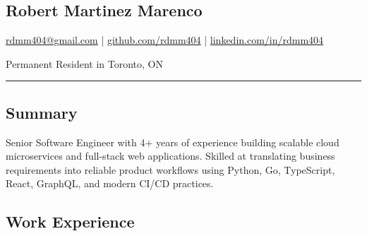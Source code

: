 \documentclass[a4paper,10pt]{article}
\begin{document}
\pagestyle{empty}

\begin{center}
  \section*{\LARGE Robert Martinez Marenco}
  \href{mailto:rdmm404@gmail.com}{rdmm404@gmail.com} |
  \href{https://github.com/rdmm404}{github.com/rdmm404} |
  \href{https://linkedin.com/in/rdmm404}{linkedin.com/in/rdmm404}

  Permanent Resident in Toronto, ON
\end{center}

\hrule
\vspace{4pt}

\subsection*{Summary}
Senior Software Engineer with 4+ years of experience building scalable cloud microservices and full-stack web applications.
Skilled at translating business requirements into reliable product workflows using Python, Go, TypeScript, React,
GraphQL, and modern CI/CD practices.
\subsection*{Work Experience}
\end{document}
